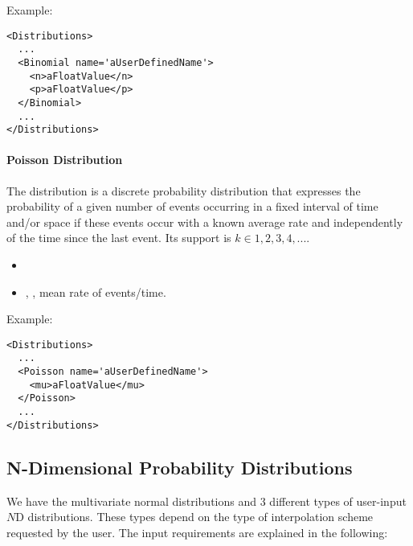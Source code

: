 Example:
\begin{lstlisting}[style=XML]
<Distributions>
  ...
  <Binomial name='aUserDefinedName'>
    <n>aFloatValue</n>
    <p>aFloatValue</p>
  </Binomial>
  ...
</Distributions>
\end{lstlisting}

\paragraph{Poisson Distribution}
\label{Poisson}
The  distribution is a discrete probability distribution that
expresses the probability of a given number of events occurring in a fixed
interval of time and/or space if these events occur with a known average rate
and independently of the time since the last event.
%
Its support is $k \in {1, 2, 3, 4, ...}$.

%
\attrIntro
\vspace{-5mm}
\begin{itemize}
\itemsep0em
\item \nameDescription   
\end{itemize}
\vspace{-5mm}
\subnodeIntro
\begin{itemize}
\item {}, , mean rate of 
  events/time.
\end{itemize}

Example:
\begin{lstlisting}[style=XML]
<Distributions>
  ...
  <Poisson name='aUserDefinedName'>
    <mu>aFloatValue</mu>
  </Poisson>
  ...
</Distributions>
\end{lstlisting}

\subsection{N-Dimensional Probability Distributions}
\label{subsec:NdDist}
We have the multivariate normal distributions and 3 different types of 
user-input $N$D distributions.
%
These types depend on the type of interpolation scheme requested by the user.
The input requirements are explained in the following:


